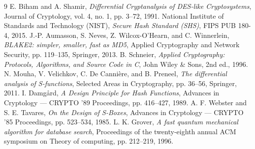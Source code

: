 \documentclass[10pt,journal,compsoc]{IEEEtran}
\begin{document}

\begin{thebibliography}{9}
E. Biham and A. Shamir, \emph{Differential Cryptanalysis of DES-like Cryptosystems}, Journal of Cryptology, vol. 4, no. 1, pp. 3--72, 1991.
National Institute of Standards and Technology (NIST), \emph{Secure Hash Standard (SHS)}, FIPS PUB 180-4, 2015.
J.-P. Aumasson, S. Neves, Z. Wilcox-O'Hearn, and C. Winnerlein, \emph{BLAKE2: simpler, smaller, fast as MD5}, Applied Cryptography and Network Security, pp. 119--135, Springer, 2013.
B. Schneier, \emph{Applied Cryptography: Protocols, Algorithms, and Source Code in C}, John Wiley \& Sons, 2nd ed., 1996.
N. Mouha, V. Velichkov, C. De Canni{\`e}re, and B. Preneel, \emph{The differential analysis of S-functions}, Selected Areas in Cryptography, pp. 36--56, Springer, 2011.
I. Damgård, \emph{A Design Principle for Hash Functions}, Advances in Cryptology — CRYPTO '89 Proceedings, pp. 416--427, 1989.
A. F. Webster and S. E. Tavares, \emph{On the Design of S-Boxes}, Advances in Cryptology — CRYPTO '85 Proceedings, pp. 523--534, 1985.
L. K. Grover, \emph{A fast quantum mechanical algorithm for database search}, Proceedings of the twenty-eighth annual ACM symposium on Theory of computing, pp. 212--219, 1996.
\end{thebibliography}
\end{document}
